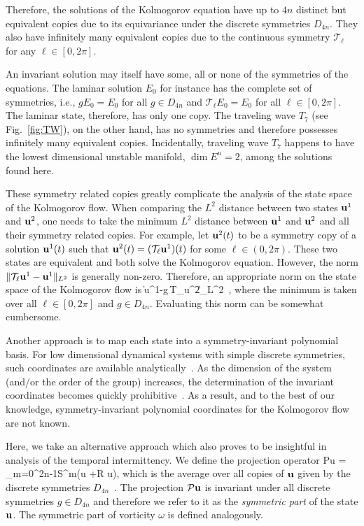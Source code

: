 \documentclass{jfm}
\begin{document}
Therefore, the solutions of the Kolmogorov equation have up to $4n$ distinct but
equivalent copies due to its equivariance under the discrete symmetries $D_{4n}$.
They also have infinitely many equivalent copies due to the continuous symmetry
$\mathcal T_\ell$ for any $\ell\in[0,2\pi]$.

An invariant solution may itself have some, all or none of the symmetries of the equations.
The laminar solution $E_0$ for instance has the complete set of symmetries, i.e., $gE_0=E_0$ for
all $g\in D_{4n}$ and $\mathcal T_\ell E_0=E_0$ for all $\ell\in[0,2\pi]$. The
laminar state, therefore, has only one copy.
The traveling wave $T_7$ (see Fig.~\ref{fig:TW}), on the other hand, has no symmetries and therefore
possesses infinitely many equivalent copies. Incidentally, traveling wave $T_7$ happens to have the
lowest dimensional unstable manifold, $\dim E^u=2$, among the solutions found here.

These symmetry related copies greatly complicate the analysis of the state space of the Kolmogorov
flow. When comparing the $L^2$ distance between two states $\mathbf u^1$ and $\mathbf u^2$,
one needs to take the minimum $L^2$ distance between $\mathbf u^1$ and $\mathbf u^2$ and all their symmetry
related copies. For example, let $\mathbf u^2(t)$ to be a symmetry copy of
a solution $\mathbf u^1(t)$ such that
$\mathbf u^2(t)=(\mathcal T_\ell\mathbf u^1)(t)$ for some $\ell\in(0,2\pi)$. These two
states are equivalent and
both solve the Kolmogorov equation. However, the norm $\|\mathcal T_\ell\mathbf u^1-\mathbf u^1\|_{L^2}$ is
generally non-zero. Therefore, an appropriate norm on the state space of the
Kolmogorov flow is
\beq
\min
\|\vc u^1-g\,\mathcal T_{\ell}\vc u^2\|_{L^2}
\,,
\eeq
where the minimum is taken over all $\ell\in[0,2\pi]$ and $g\in D_{4n}$.
Evaluating this norm can be somewhat cumbersome.

Another approach is to map each state into a symmetry-invariant polynomial
basis.
For low dimensional dynamical systems with simple discrete
symmetries, such coordinates are available
analytically~\citep{GL-Gil07b}. As the dimension of the system (and/or the order of the
group) increases, the
determination of the invariant coordinates becomes quickly prohibitive~\citep{SiCvi10}.
As a result, and to the best of our knowledge,
symmetry-invariant polynomial
coordinates for the Kolmogorov flow are not known.

Here, we take an alternative approach which also proves to be insightful in analysis
of the temporal intermittency. We define the projection operator
\beq
\mathcal P\mathbf u = \sum_{m=0}^{2n-1}\mathcal S^m\left(\mathbf u +\mathcal R\mathbf
u\right),
\label{DnA1proj}
\eeq
which is the average over all copies of $\mathbf u$ given by the discrete symmetries
$D_{4n}$~\citep{DasBuch}.
The projection $\mathcal P\mathbf u$ is invariant under all discrete symmetries $g\in D_{4n}$
and therefore we refer to it as the \emph{symmetric part} of the state $\mathbf u$. The symmetric
part of vorticity $\omega$ is defined analogously.
\end{document}
